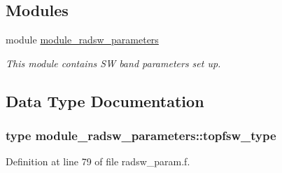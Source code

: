 \subsection*{Modules}
\begin{DoxyCompactItemize}
\item 
module \hyperlink{namespacemodule__radsw__parameters}{module\+\_\+radsw\+\_\+parameters}
\begin{DoxyCompactList}\small\item\em This module contains SW band parameters set up. \end{DoxyCompactList}\end{DoxyCompactItemize}


\subsection{Data Type Documentation}
\label{structmodule__radsw__parameters_1_1topfsw__type}
\hypertarget{namespacemodule__radsw__parameters_structmodule__radsw__parameters_1_1topfsw__type}{}
\subsubsection{type module\+\_\+radsw\+\_\+parameters\+:\+:topfsw\+\_\+type}


Definition at line 79 of file radsw\+\_\+param.\+f.




